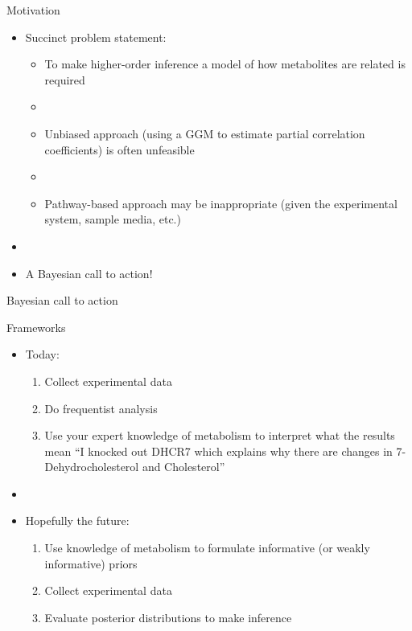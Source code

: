 \documentclass[xcolor=dvipsnames]{beamer}
\begin{document}
\begin{frame}{Motivation}
	\vspace{-15.5pt}
	\begin{itemize}
		\item Succinct problem statement: 
		\begin{itemize}
			\item To make higher-order inference a model of how metabolites are related is required
			\item[]
			\item Unbiased approach (using a GGM to estimate partial correlation coefficients) is often unfeasible 
			\item[]
			\item Pathway-based approach may be inappropriate (given the experimental system, sample media, etc.)
		\end{itemize}
		\item[]
		\item A Bayesian call to action!
	\end{itemize}
\end{frame}

\begin{frame}{Bayesian call to action}
	
	{\LARGE Frameworks}
	\begin{itemize}
		\item Today:
		\begin{enumerate}[{1)}]
			\item Collect experimental data
			\item Do frequentist analysis
			\item Use your expert knowledge of metabolism to interpret what the results mean ``I knocked out DHCR7 which explains why there are changes in 7-Dehydrocholesterol and Cholesterol''
		\end{enumerate}
		\item[]
		\item Hopefully the future:
		\begin{enumerate}[{1)}]
			\item Use knowledge of metabolism to formulate informative (or weakly informative) priors
			\item Collect experimental data
			\item Evaluate posterior distributions to make inference
		\end{enumerate}
	\end{itemize}
\end{frame}
\end{document}

